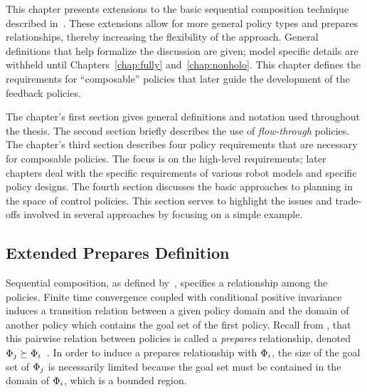 

This chapter presents extensions to the basic sequential composition technique
described in~\cite{bur_riz_kod_99}.  These extensions allow for more general policy
types and prepares relationships, thereby increasing the flexibility of the approach.
General definitions that help formalize the discussion are given; model specific
details are withheld until Chapters~\ref{chap:fully} and~\ref{chap:nonholo}.  This
chapter defines the requirements for ``composable'' policies that later guide the
development of the feedback policies.

The chapter's first section gives general definitions and notation used throughout
the thesis.  The second section briefly describes the use of \emph{flow-through}
policies.  The chapter's third section describes four policy requirements that are
necessary for composable policies.  The focus is on the high-level requirements;
later chapters deal with the specific requirements of various robot models and
specific policy designs.  The fourth section discusses the basic approaches to
planning in the space of control policies.  This section serves to highlight the
issues and trade-offs involved in several approaches by focusing on a simple example.


\subsection{Extended Prepares Definition}
\label{sec:extended_prepares}

Sequential composition, as defined by~\cite{bur_riz_kod_99}, specifies a relationship
among the policies.  Finite time convergence coupled with conditional positive
invariance induces a transition relation between a given policy domain and the domain
of another policy which contains the goal set of the first policy.  Recall from
, that this pairwise relation between policies is called
a \emph{prepares} relationship, denoted $\Phi_j \succeq \Phi_i$~\cite{bur_riz_kod_99}.
In order to induce a prepares relationship with $\Phi_i$, the size of the goal set of
$\Phi_j$ is necessarily limited because the goal set must be contained in the domain
of $\Phi_i$, which is a bounded region.

